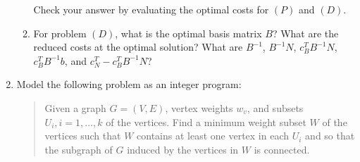\documentclass[12pt]{article}
\begin{document}
\begin{enumerate}
\begin{enumerate}
                  Check your answer by evaluating the optimal costs for
                  $(P)$ and $(D)$.
           \item  For problem $(D)$, what is the optimal basis matrix $B$?
                  What are the reduced costs at the optimal solution?
                  What are $B^{-1}$, $B^{-1}N$, $c_B^TB^{-1}N$,
                  $c_B^TB^{-1}b$, and $c_N^T-c_B^TB^{-1}N$?
         \end{enumerate}


\item Model the following problem as an integer program:
\begin{quote}
Given a graph $G=(V,E)$, vertex weights $w_v$,
and subsets $U_i, i=1,\ldots,k$ of the vertices.
Find a minimum weight subset $W$ of the vertices such that
$W$ contains at least one vertex in each $U_i$
and so that the subgraph of $G$ induced by the vertices in $W$ is  connected.
\end{quote}



\end{enumerate}
\end{document}

